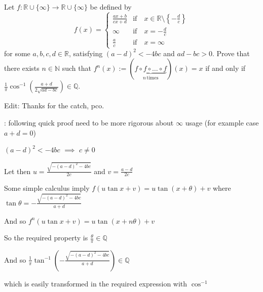 \begin{solution}
	\begin{tcolorbox}Let $f: \mathbb{R} \cup \{\infty\} \to \mathbb{R} \cup \{\infty\}$ be defined by
\[ f(x) = \begin{cases} \frac{ax+b}{cx + d} & \mathrm{if} \quad x \in \mathbb{R} \setminus \left\{-\frac{d}{c}\right\} \\ \infty & \mathrm{if} \quad x = -\frac{d}{c} \\
\frac{a}{c} & \mathrm{if} \quad x = \infty \end{cases} \]
for some $a, b, c, d \in \mathbb{R}$, satisfying $(a - d)^2 < -4bc$ and $ad - bc > 0$.
Prove that there exists $n \in \mathbb{N}$ such that $f^{n}(x) := (\underbrace{f \circ f \circ \dots \circ f}_{n \, \mathrm{times}})(x) = x$ if and only if $\frac{1}{\pi}\cos^{-1}\left(\frac{a+d}{2\sqrt{ad - bc}}\right) \in \mathbb{Q}$.

Edit: Thanks for the catch, pco.\end{tcolorbox}
: following quick proof need to be more rigorous about $\infty$ usage (for example case $a+d=0$)

$(a-d)^2<-4bc$ $\implies$ $c\ne 0$

Let then $u=\frac{\sqrt{-(a-d)^2-4bc}}{2c}$ and $v=\frac{a-d}{2c}$

Some simple calculus imply $f(u\tan x +v)=u\tan (x+\theta) +v$ where $\tan\theta=-\frac{\sqrt{-(a-d)^2-4bc}}{a+d}$

And so $f^n(u\tan x+v)=u\tan (x+n\theta) +v$

So the required property is $\frac{\theta}{\pi}\in\mathbb Q$

And so $\frac 1{\pi}\tan^{-1}\left(-\frac{\sqrt{-(a-d)^2-4bc}}{a+d}\right)\in\mathbb Q$

which is easily transformed in the required expression with $\cos^{-1}$
\end{solution}



